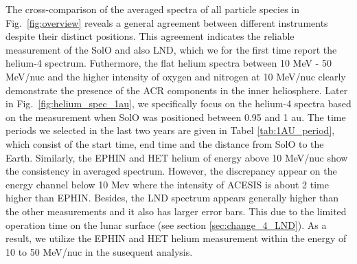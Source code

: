 The cross-comparison of the averaged spectra of all particle species in Fig.~\ref{fig:overview} reveals a general agreement between different instruments despite their distinct positions. This agreement indicates the reliable measurement of the \ac{SolO} and also \ac{LND}, which we for the first time report the helium-4 spectrum. Futhermore, the flat helium spectra between 10 MeV - 50 MeV/nuc and the higher intensity of oxygen and nitrogen at 10 MeV/nuc clearly demonstrate the presence of the \ac{ACR} components in the inner heliosphere. 
Later in Fig.~\ref{fig:helium_spec_1au}, we specifically focus on the helium-4 spectra based on the measurement when \ac{SolO} was positioned between 0.95 and 1 au. The time periods we selected in the last two years are given in Tabel \ref{tab:1AU_period}, which consist of the start time, end time and the distance from \ac{SolO} to the Earth.
Similarly, the \ac{EPHIN} and \ac{HET} helium of energy above 10 MeV/nuc show  the consistency in averaged spectrum. However, the discrepancy appear on the energy channel below 10 Mev where the intensity of \ac{ACESIS} is about 2 time higher than \ac{EPHIN}. Besides, the \ac{LND} spectrum appears generally higher than the other measurements and it also has larger error bars. This due to the limited operation time on the lunar surface (see section \ref{sec:change_4_LND}). As a result, we utilize the \ac{EPHIN} and \ac{HET} helium measurement within the energy of 10 to 50 MeV/nuc in the susequent analysis.



